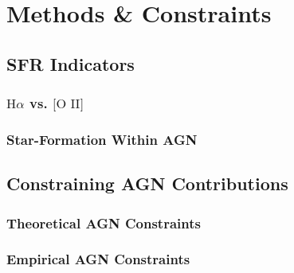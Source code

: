 \section{Methods \& Constraints}
\subsection{SFR Indicators}
\subsubsection{$\text{H}\alpha$ vs. $\text{[O II]}$}
\subsubsection{Star-Formation Within AGN}
\subsection{Constraining AGN Contributions}
\subsubsection{Theoretical AGN Constraints}
\subsubsection{Empirical AGN Constraints}
  